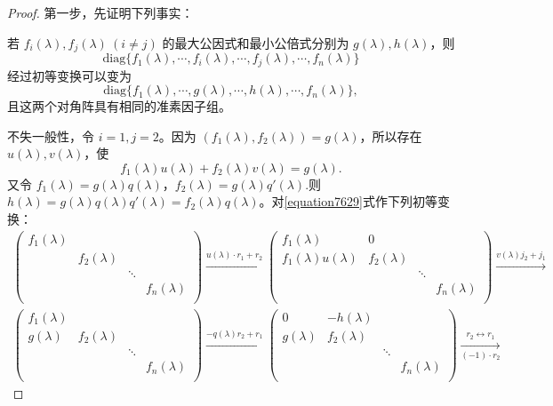 \documentclass[../../main.tex]{subfiles}%
\begin{document}
\begin{proof}
第一步，先证明下列事实：

若 $f_i(\lambda), f_j(\lambda)\ (i\neq j)$ 的最大公因式和最小公倍式分别为 $g(\lambda), h(\lambda)$，则
\[
\mathrm{diag}\{f_1(\lambda),\cdots,f_i(\lambda),\cdots,f_j(\lambda),\cdots,f_n(\lambda)\}
\]
经过初等变换可以变为
\[
\mathrm{diag}\{f_1(\lambda),\cdots,g(\lambda),\cdots,h(\lambda),\cdots,f_n(\lambda)\},
\]
且这两个对角阵具有相同的准素因子组。

不失一般性，令 $i = 1, j = 2$。因为 $(f_1(\lambda), f_2(\lambda)) = g(\lambda)$，所以存在 $u(\lambda), v(\lambda)$，使
\[
f_1(\lambda)u(\lambda)+f_2(\lambda)v(\lambda)=g(\lambda).
\]
又令 $f_1(\lambda)=g(\lambda)q(\lambda)$，$f_2(\lambda)=g(\lambda)q'(\lambda)$.则 $h(\lambda)=g(\lambda)q(\lambda)q'(\lambda)=f_2(\lambda)q(\lambda)$。对\eqref{equation7629}式作下列初等变换：
\begin{gather*}
\left( \begin{matrix}
f_1(\lambda )&		&		&		\\
&		f_2(\lambda )&		&		\\
&		&		\ddots&		\\
&		&		&		f_n(\lambda )\\
\end{matrix} \right) \xrightarrow{u(\lambda )\cdot r_1+r_2}\left( \begin{matrix}
f_1(\lambda )&		0&		&		\\
f_1(\lambda )u(\lambda )&		f_2(\lambda )&		&		\\
&		&		\ddots&		\\
&		&		&		f_n(\lambda )\\
\end{matrix} \right) \xrightarrow{v(\lambda )j_2+j_1}
\\
\left( \begin{matrix}
f_1(\lambda )&		&		&		\\
g(\lambda )&		f_2(\lambda )&		&		\\
&		&		\ddots&		\\
&		&		&		f_n(\lambda )\\
\end{matrix} \right) \xrightarrow{-q(\lambda )r_2+r_1}\left( \begin{matrix}
0&		-h(\lambda )&		&		\\
g(\lambda )&		f_2(\lambda )&		&		\\
&		&		\ddots&		\\
&		&		&		f_n(\lambda )\\
\end{matrix} \right) \underset{\left( -1 \right) \cdot r_2}{\xrightarrow{r_2\longleftrightarrow r_1}}

\end{gather*}
\end{proof}
\end{document}
